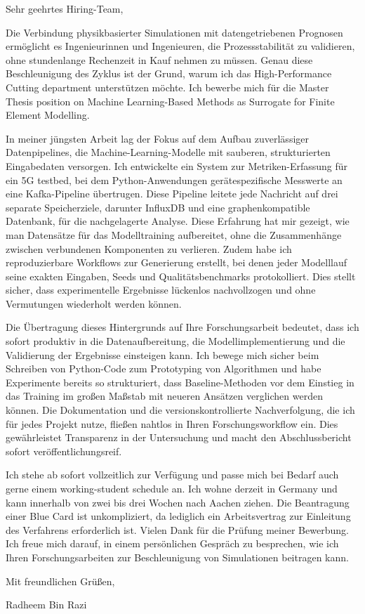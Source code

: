 \documentclass[11pt,a4paper]{coverletter}
\begin{document}

\opening{Sehr geehrtes Hiring-Team,}

Die Verbindung physikbasierter Simulationen mit datengetriebenen Prognosen ermöglicht es Ingenieurinnen und Ingenieuren, die Prozessstabilität zu validieren, ohne stundenlange Rechenzeit in Kauf nehmen zu müssen. Genau diese Beschleunigung des Zyklus ist der Grund, warum ich das High-Performance Cutting department unterstützen möchte. Ich bewerbe mich für die Master Thesis position on Machine Learning-Based Methods as Surrogate for Finite Element Modelling.

In meiner jüngsten Arbeit lag der Fokus auf dem Aufbau zuverlässiger Datenpipelines, die Machine-Learning-Modelle mit sauberen, strukturierten Eingabedaten versorgen. Ich entwickelte ein System zur Metriken-Erfassung für ein 5G testbed, bei dem Python-Anwendungen gerätespezifische Messwerte an eine Kafka-Pipeline übertrugen. Diese Pipeline leitete jede Nachricht auf drei separate Speicherziele, darunter InfluxDB und eine graphenkompatible Datenbank, für die nachgelagerte Analyse. Diese Erfahrung hat mir gezeigt, wie man Datensätze für das Modelltraining aufbereitet, ohne die Zusammenhänge zwischen verbundenen Komponenten zu verlieren. Zudem habe ich reproduzierbare Workflows zur Generierung erstellt, bei denen jeder Modelllauf seine exakten Eingaben, Seeds und Qualitätsbenchmarks protokolliert. Dies stellt sicher, dass experimentelle Ergebnisse lückenlos nachvollzogen und ohne Vermutungen wiederholt werden können.

Die Übertragung dieses Hintergrunds auf Ihre Forschungsarbeit bedeutet, dass ich sofort produktiv in die Datenaufbereitung, die Modellimplementierung und die Validierung der Ergebnisse einsteigen kann. Ich bewege mich sicher beim Schreiben von Python-Code zum Prototyping von Algorithmen und habe Experimente bereits so strukturiert, dass Baseline-Methoden vor dem Einstieg in das Training im großen Maßstab mit neueren Ansätzen verglichen werden können. Die Dokumentation und die versionskontrollierte Nachverfolgung, die ich für jedes Projekt nutze, fließen nahtlos in Ihren Forschungsworkflow ein. Dies gewährleistet Transparenz in der Untersuchung und macht den Abschlussbericht sofort veröffentlichungsreif.

Ich stehe ab sofort vollzeitlich zur Verfügung und passe mich bei Bedarf auch gerne einem working-student schedule an. Ich wohne derzeit in Germany und kann innerhalb von zwei bis drei Wochen nach Aachen ziehen. Die Beantragung einer Blue Card ist unkompliziert, da lediglich ein Arbeitsvertrag zur Einleitung des Verfahrens erforderlich ist. Vielen Dank für die Prüfung meiner Bewerbung. Ich freue mich darauf, in einem persönlichen Gespräch zu besprechen, wie ich Ihren Forschungsarbeiten zur Beschleunigung von Simulationen beitragen kann.

\closing{Mit freundlichen Grüßen,}{Radheem Bin Razi}
\end{document}
